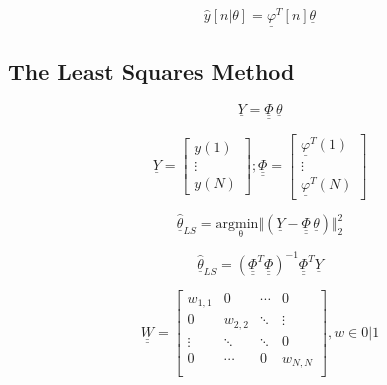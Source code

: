  \begin{equation}
			\hat{y}[n|\theta] = \underline{\varphi}^T[n] \underline{\theta}		
	\label{eq:matrixresult_2}
\end{equation}



\subsection{The Least Squares Method}
\label{sec:lestsquaremethod}



 \begin{equation}
			\underline{Y} = \underline{\underline{\Phi}} \, \underline{\theta}		
	\label{eq:LS_basic}
\end{equation}

 \begin{equation}
			\underline{Y} =  \begin{bmatrix}
		y(1)\\
		\vdots \\
		y(N)
				\end{bmatrix}	; 
							\underline{\underline{\Phi}} =  \begin{bmatrix}
		\underline{\varphi}^T(1)\\
		\vdots \\
		\underline{\varphi}^T(N)
				\end{bmatrix}	
	\label{eq:Y_Phi_matrice}
\end{equation}



 \begin{equation}
			\hat{\underline{\theta}}_{LS} = \mathrm{arg \underset{\theta} min} \Vert (\underline{Y}-\underline{\underline{\Phi}} \, \underline{\theta}) \Vert^2_2 	
	\label{eq:LS_intro}
\end{equation}

 \begin{equation}
			\hat{\underline{\theta}}_{LS} = (\underline{\underline{\Phi}}^T\underline{\underline{\Phi}})^{-1}\underline{\underline{\Phi}}^T\underline{Y}	
	\label{eq:LS_intro_solved}
\end{equation}


 \begin{equation}
			\underline{\underline{W}}  =  \begin{bmatrix}
		w_{1,1} & 0 & \cdots & 0 \\
		0 & w_{2,2} & \ddots & \vdots \\
		\vdots & \ddots & \ddots & 0 \\
		0 & \cdots & 0 & w_{N,N} \\
				\end{bmatrix},
				w \in {0|1}
	\label{eq:weightmatrix}
\end{equation}



